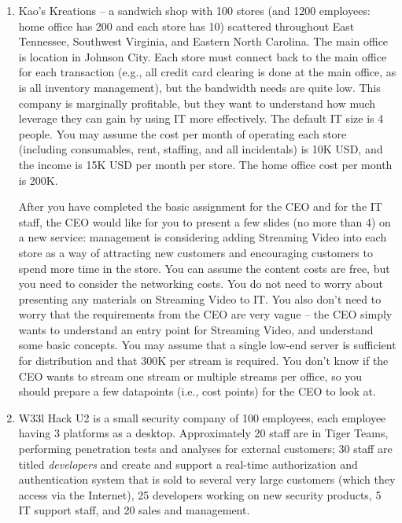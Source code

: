 \documentclass{exam}
\begin{document}
\begin{questions}
\begin{enumerate}
\item Kao's Kreations -- a sandwich shop with 100 stores (and 1200
  employees: home office has 200 and each store has 10) scattered throughout
  East Tennessee, Southwest Virginia, and Eastern North Carolina.  The main
  office is location in Johnson City.  Each store must connect back to
  the main office for each transaction (e.g., all credit card clearing
  is done at the main office, as is all inventory management), but
  the bandwidth needs are quite low.  This 
  company is marginally profitable, but they want to understand how much
  leverage they can gain by using IT more effectively.  The default IT
  size is 4 people.  You may assume the cost per month of operating each
  store (including consumables, rent, staffing, and all incidentals) is 
  10K USD, and the income is 15K USD per month per store.  The home office 
  cost per month is 200K.  

  After you have completed the basic assignment for the CEO and for the
  IT staff, the CEO would like for you to present a few slides (no more
  than 4) on a new service:  management is considering adding Streaming
  Video into each store as a way of attracting new customers and encouraging
  customers to spend more time in the store.  You can assume the content
  costs are free, but you need to consider the networking costs.  You 
  do not need to worry about presenting any materials on Streaming Video
  to IT.  You also don't need to worry that the requirements from the CEO
  are very vague -- the CEO simply wants to understand an entry point
  for Streaming Video, and understand some basic concepts.  You may assume
  that a single low-end server is sufficient for distribution and that
  300K per stream is required.  You don't know if the CEO wants to stream
  one stream or multiple streams per office, so you should prepare a few
  datapoints (i.e., cost points) for the CEO to look at.
  
\item W33l Hack U2 is a small security company of 100 employees, each
  employee having 3 platforms as a desktop.  Approximately 20 staff
  are in Tiger Teams, performing penetration tests and analyses for
  external customers; 30 staff are titled \emph{developers} and
  create and support a real-time authorization
  and authentication system that is sold to several very large customers
  (which they access via the Internet),
  25 developers working on new security products, 5 IT support staff, 
  and 20 sales and management.  


\end{enumerate}
\end{questions}
\end{document}
